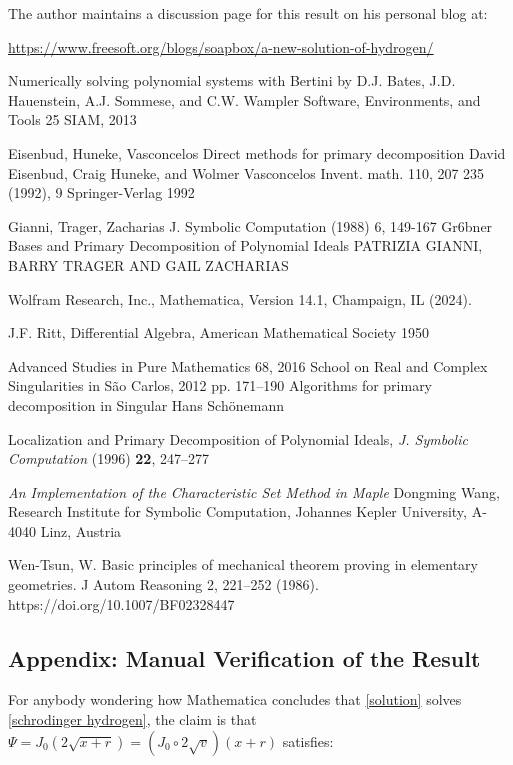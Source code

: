 \documentclass{article}
\begin{document}
The author maintains a discussion page for this result on his personal blog at:

\begin{center}
\small
\url{https://www.freesoft.org/blogs/soapbox/a-new-solution-of-hydrogen/}
\end{center}

\begin{thebibliography}{9}
Numerically solving polynomial systems with Bertini
by D.J. Bates, J.D. Hauenstein, A.J. Sommese, and C.W. Wampler
Software, Environments, and Tools 25
SIAM, 2013

 Eisenbud, Huneke, Vasconcelos
Direct methods for primary decomposition
David Eisenbud, Craig Huneke, and Wolmer Vasconcelos
Invent. math. 110, 207 235 (1992),
9 Springer-Verlag 1992

 Gianni, Trager, Zacharias
J. Symbolic Computation (1988) 6, 149-167
Gr6bner Bases and Primary Decomposition of
Polynomial Ideals
PATRIZIA GIANNI, BARRY TRAGER AND GAIL ZACHARIAS

Wolfram Research, Inc., Mathematica, Version 14.1, Champaign, IL (2024).

J.F. Ritt, Differential Algebra, American Mathematical Society 1950

Advanced Studies in Pure Mathematics 68, 2016
School on Real and Complex Singularities in São Carlos, 2012
pp. 171–190
Algorithms for primary decomposition in Singular
Hans Schönemann

 Localization and Primary Decomposition of Polynomial Ideals, {\it J. Symbolic Computation} (1996) {\bf 22}, 247–277

{\it An Implementation of the Characteristic Set Method in Maple}
Dongming Wang,
Research Institute for Symbolic Computation,
Johannes Kepler University, A-4040 Linz, Austria

Wen-Tsun, W. Basic principles of mechanical theorem proving in elementary geometries. J Autom Reasoning 2, 221–252 (1986). https://doi.org/10.1007/BF02328447

\end{thebibliography}

\vfill\eject
\subsection*{Appendix: Manual Verification of the Result}
For anybody wondering how Mathematica concludes that \eqref{solution} solves \eqref{schrodinger hydrogen},
the claim is that $\Psi = J_0(2\sqrt{x+r}) = (J_0 \circ 2\sqrt{v}) (x+r)$ satisfies:
\end{document}
